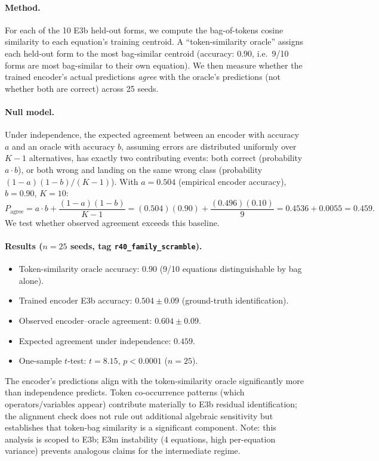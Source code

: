 \paragraph{Method.} For each of the 10 E3b held-out forms, we compute the bag-of-tokens cosine similarity to each equation's training centroid. A ``token-similarity oracle'' assigns each held-out form to the most bag-similar centroid (accuracy: $0.90$, i.e.\ 9/10 forms are most bag-similar to their own equation). We then measure whether the trained encoder's actual predictions \emph{agree} with the oracle's predictions (not whether both are correct) across 25 seeds.

\paragraph{Null model.} Under independence, the expected agreement between an encoder with accuracy $a$ and an oracle with accuracy $b$, assuming errors are distributed uniformly over $K{-}1$ alternatives, has exactly two contributing events: both correct (probability $a \cdot b$), or both wrong and landing on the same wrong class (probability $(1{-}a)(1{-}b)/(K{-}1)$). With $a{=}0.504$ (empirical encoder accuracy), $b{=}0.90$, $K{=}10$:
\[
P_{\text{agree}} = a \cdot b + \frac{(1{-}a)(1{-}b)}{K{-}1} = (0.504)(0.90) + \frac{(0.496)(0.10)}{9} = 0.4536 + 0.0055 = 0.459.
\]
We test whether observed agreement exceeds this baseline.

\paragraph{Results ($n{=}25$ seeds, tag \texttt{r40\_family\_scramble}).}
\begin{itemize}[noitemsep]
  \item Token-similarity oracle accuracy: $0.90$ (9/10 equations distinguishable by bag alone).
  \item Trained encoder E3b accuracy: $0.504 \pm 0.09$ (ground-truth identification).
  \item Observed encoder--oracle agreement: $0.604 \pm 0.09$.
  \item Expected agreement under independence: $0.459$.
  \item One-sample $t$-test: $t{=}8.15$, $p{<}0.0001$ ($n{=}25$).
\end{itemize}
The encoder's predictions align with the token-similarity oracle significantly more than independence predicts. Token co-occurrence patterns (which operators/variables appear) contribute materially to E3b residual identification; the alignment check does not rule out additional algebraic sensitivity but establishes that token-bag similarity is a significant component. Note: this analysis is scoped to E3b; E3m instability (4 equations, high per-equation variance) prevents analogous claims for the intermediate regime.

